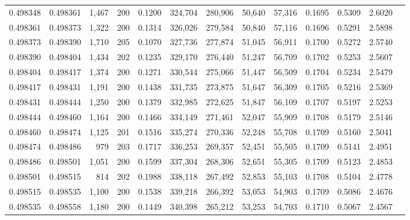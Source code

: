 \begin{tabular}{rrrrrrrrrrrrr}
0.498348 & 0.498361 & 1,467 & 200 &                                     0.1200 & 324,704 & 280,906 &  50,640 &  57,316 & 0.1695 & 0.5309 & 2.6020 \\
0.498361 & 0.498373 & 1,322 & 200 &                                     0.1314 & 326,026 & 279,584 &  50,840 &  57,116 & 0.1696 & 0.5291 & 2.5898 \\
0.498373 & 0.498390 & 1,710 & 205 &                                     0.1070 & 327,736 & 277,874 &  51,045 &  56,911 & 0.1700 & 0.5272 & 2.5740 \\
0.498390 & 0.498404 & 1,434 & 202 &                                     0.1235 & 329,170 & 276,440 &  51,247 &  56,709 & 0.1702 & 0.5253 & 2.5607 \\
0.498404 & 0.498417 & 1,374 & 200 &                                     0.1271 & 330,544 & 275,066 &  51,447 &  56,509 & 0.1704 & 0.5234 & 2.5479 \\
0.498417 & 0.498431 & 1,191 & 200 &                                     0.1438 & 331,735 & 273,875 &  51,647 &  56,309 & 0.1705 & 0.5216 & 2.5369 \\
0.498431 & 0.498444 & 1,250 & 200 &                                     0.1379 & 332,985 & 272,625 &  51,847 &  56,109 & 0.1707 & 0.5197 & 2.5253 \\
0.498444 & 0.498460 & 1,164 & 200 &                                     0.1466 & 334,149 & 271,461 &  52,047 &  55,909 & 0.1708 & 0.5179 & 2.5146 \\
0.498460 & 0.498474 & 1,125 & 201 &                                     0.1516 & 335,274 & 270,336 &  52,248 &  55,708 & 0.1709 & 0.5160 & 2.5041 \\
0.498474 & 0.498486 &   979 & 203 &                                     0.1717 & 336,253 & 269,357 &  52,451 &  55,505 & 0.1709 & 0.5141 & 2.4951 \\
0.498486 & 0.498501 & 1,051 & 200 &                                     0.1599 & 337,304 & 268,306 &  52,651 &  55,305 & 0.1709 & 0.5123 & 2.4853 \\
0.498501 & 0.498515 &   814 & 202 &                                     0.1988 & 338,118 & 267,492 &  52,853 &  55,103 & 0.1708 & 0.5104 & 2.4778 \\
0.498515 & 0.498535 & 1,100 & 200 &                                     0.1538 & 339,218 & 266,392 &  53,053 &  54,903 & 0.1709 & 0.5086 & 2.4676 \\
0.498535 & 0.498558 & 1,180 & 200 &                                     0.1449 & 340,398 & 265,212 &  53,253 &  54,703 & 0.1710 & 0.5067 & 2.4567 \\

\end{tabular}
